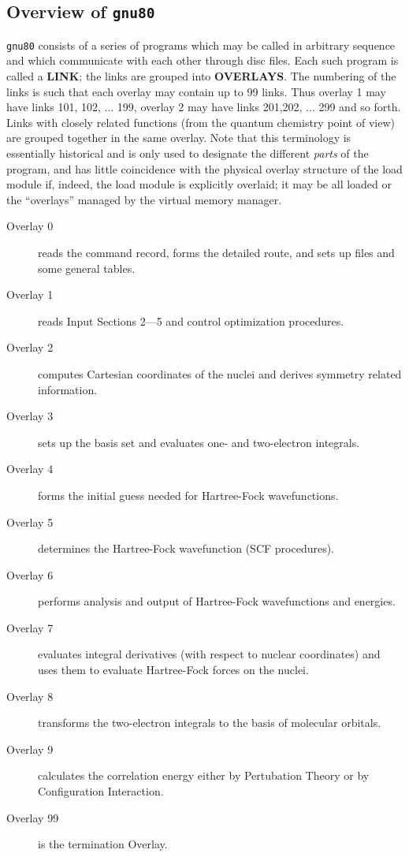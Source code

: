 \subsection{\sf Overview of {\tt gnu80}}
{\tt gnu80} consists of a series of programs which may be called in
arbitrary sequence and which communicate with each other through disc
files. Each such program is called a {\bf LINK}; the links are grouped into
{\bf OVERLAYS}. The numbering of the links is such that each overlay may
contain up to 99 links. Thus overlay 1 may have links 101, 102, ...
199, overlay 2 may have links 201,202, ... 299 and so forth. Links with
closely related functions 
(from the quantum chemistry point of view)
are grouped together in the same overlay.
Note that this terminology is essentially historical and
is only used to designate the different
{\em parts} of the program, and has little coincidence with the physical
overlay structure of the load module if, indeed, the load module
is explicitly overlaid; it may be all loaded or the ``overlays''
managed by the virtual memory manager.
\begin{description}
\item[Overlay 0] reads the command record, forms the detailed
route, and sets up files and some general tables.
\item[Overlay 1] reads Input Sections 2---5 and control optimization
procedures.
\item[Overlay 2] computes Cartesian coordinates of the nuclei and derives
symmetry related information.
\item[Overlay 3] sets up the basis set and evaluates one- and two-electron
integrals.
\item[Overlay 4] forms the initial guess needed for Hartree-Fock
wavefunctions.
\item[Overlay 5] determines the Hartree-Fock wavefunction (SCF procedures).
\item[Overlay 6] performs analysis and output of Hartree-Fock wavefunctions
and energies.
\item[Overlay 7] evaluates integral derivatives (with respect to nuclear
coordinates) and uses them to evaluate Hartree-Fock forces on the
nuclei.
\item[Overlay 8] transforms the two-electron integrals to the basis of
molecular orbitals.
\item[Overlay 9] calculates the correlation energy either by Pertubation
Theory or by Configuration Interaction.
\item[Overlay 99] is the termination Overlay.
\end{description}

